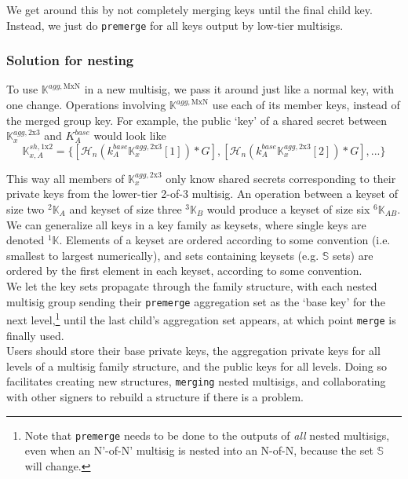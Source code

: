 We get around this by not completely merging keys until the final child key. Instead, we just do {\tt premerge} for all keys output by low-tier multisigs.

\subsubsection*{Solution for nesting}

To use $\mathbb{K}^{agg,\textrm{MxN}}$ in a new multisig, we pass it around just like a normal key, with one change. Operations involving $\mathbb{K}^{agg,\textrm{MxN}}$ use each of its member keys, instead of the merged group key. For example, the public `key' of a shared secret between $\mathbb{K}^{agg,\textrm{2x3}}_x$ and $K^{base}_A$ would look like\vspace{.175cm}
\[\mathbb{K}^{sh,\textrm{1x2}}_{x,A} = \{ [\mathcal{H}_n(k^{base}_A \mathbb{K}^{agg,\textrm{2x3}}_x[1])*G], [\mathcal{H}_n(k^{base}_A \mathbb{K}^{agg,\textrm{2x3}}_x[2])*G], ...\}\]

This way all members of $\mathbb{K}^{agg,\textrm{2x3}}_x$ only know shared secrets corresponding to their private keys from the lower-tier 2-of-3 multisig. An operation between a keyset of size two ${}^{2}\mathbb{K}_A$ and keyset of size three ${}^{3}\mathbb{K}_B$ would produce a keyset of size six ${}^{6}\mathbb{K}_{AB}$. We can generalize all keys in a key family as keysets, where single keys are denoted ${}^{1}\mathbb{K}$. Elements of a keyset are ordered according to some convention (i.e. smallest to largest numerically), and sets containing keysets (e.g. $\mathbb{S}$ sets) are ordered by the first element in each keyset, according to some convention.\\

We let the key sets propagate through the family structure, with each nested multisig group sending their {\tt premerge} aggregation set as the `base key' for the next level,\footnote{Note that {\tt premerge} needs to be done to the outputs of {\em all} nested multisigs, even when an N'-of-N' multisig is nested into an N-of-N, because the set $\mathbb{S}$ will change.} until the last child's aggregation set appears, at which point {\tt merge} is finally used.\\

Users should store their base private keys, the aggregation private keys for all levels of a multisig family structure, and the public keys for all levels. Doing so facilitates creating new structures, {\tt merging} nested multisigs, and collaborating with other signers to rebuild a structure if there is a problem.


